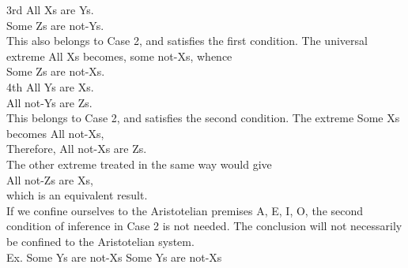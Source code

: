 \documentclass{article}
\begin{document}
{{{{\hspace*{.2in}
3rd All Xs are Ys.\vspace{.1in}\\
\hspace*{.35in}
Some Zs are not-Ys.\vspace{.1in}\\
\hspace*{.2in}
This also belongs to Case 2, and satisfies the first condition. The universal
extreme All Xs becomes, some not-Xs, whence\vspace{.1in}\\
\hspace*{.2in}
Some Zs are not-Xs.\vspace{.1in}\\
\hspace*{.2in}
4th All Ys are Xs.\vspace{.1in}\\
\hspace*{.4in}
All not-Ys are Zs.\vspace{.1in}\\
\hspace*{.2in}
This belongs to Case 2, and satisfies the second condition. The extreme
Some Xs becomes All not-Xs,\vspace{.1in}\\
\hspace*{.2in}
Therefore, All not-Xs are Zs.\vspace{.1in}\\
The other extreme treated in the same way would give\vspace{.1in}\\
\hspace*{.2in}
All not-Zs are Xs,\vspace{.1in}\\
which is an equivalent result.\vspace{.1in}\\
\hspace*{.2in}
If we confine ourselves to the Aristotelian premises A, E, I, O, the second
condition of inference in Case 2 is not needed. The conclusion will not necessarily
be confined to the Aristotelian system.\vspace{.1in}\\
\hspace*{.2in}
Ex. Some Ys are not-Xs \hspace*{.2in} Some Ys are not-Xs\vspace{.1in}\\
\hspace*{.4in}
}}}}
\end{document}
